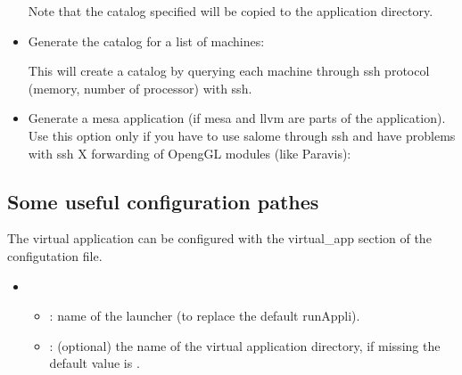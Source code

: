 \documentclass[a4paper,10pt,english]{sphinxmanual}
\begin{document}
\begin{itemize}
%
\begin{sphinxVerbatim}[commandchars=\\\{\}]
    
\end{sphinxVerbatim}

Note that the catalog specified will be copied to the application directory.

\item {} 
Generate the catalog for a list of machines:

%
\begin{sphinxVerbatim}[commandchars=\\\{\}]
    
\end{sphinxVerbatim}

This will create a catalog by querying each machine through ssh protocol (memory, number of processor) with ssh.

\item {} 
Generate a mesa application (if mesa and llvm are parts of the application). Use this option only if you have to use salome through ssh and have problems with ssh X forwarding of OpengGL modules (like Paravis):

%
\begin{sphinxVerbatim}[commandchars=\\\{\}]
   
\end{sphinxVerbatim}

\end{itemize}


\subsection{Some useful configuration pathes}
\label{\detokenize{commands/application:some-useful-configuration-pathes}}
The virtual application can be configured with the virtual\_app section of the configutation file.
\begin{itemize}
\item {} 
\begin{itemize}
\item {} 
 : name of the launcher (to replace the default runAppli).

\item {} 
 : (optional) the name of the virtual application directory, if missing the default value is .

\end{itemize}

\end{itemize}
\end{document}

